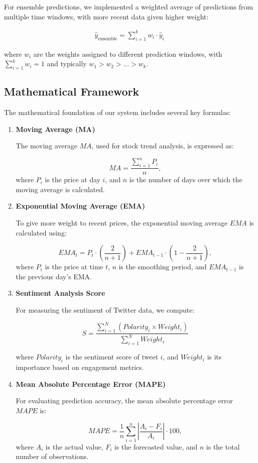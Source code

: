 \documentclass[conference]{IEEEtran}
\begin{document}
For ensemble predictions, we implemented a weighted average of predictions from multiple time windows, with more recent data given higher weight:

\begin{equation}
\begin{aligned}
\hat{y}_{\text{ensemble}} = \sum_{i=1}^{k} w_i \cdot \hat{y}_i
\end{aligned}
\end{equation}

where $w_i$ are the weights assigned to different prediction windows, with $\sum_{i=1}^{k} w_i = 1$ and typically $w_1 > w_2 > ... > w_k$.

\subsection{Mathematical Framework}

The mathematical foundation of our system includes several key formulas:

\begin{enumerate}
\item \textbf{Moving Average (MA)}
    
The moving average \( MA \), used for stock trend analysis, is expressed as:

\[
MA = \frac{\sum_{i=1}^{n} P_i}{n},
\]
where \( P_i \) is the price at day \( i \), and \( n \) is the number of days over which the moving average is calculated.

\item \textbf{Exponential Moving Average (EMA)}
    
To give more weight to recent prices, the exponential moving average \( EMA \) is calculated using:

\[
EMA_t = P_t \cdot \left(\frac{2}{n+1}\right) + EMA_{t-1} \cdot \left(1 - \frac{2}{n+1}\right),
\]
where \( P_t \) is the price at time \( t \), \( n \) is the smoothing period, and \( EMA_{t-1} \) is the previous day's EMA.

\item \textbf{Sentiment Analysis Score}

For measuring the sentiment of Twitter data, we compute:

\[
S = \frac{\sum_{i=1}^{N} (Polarity_i \times Weight_i)}{\sum_{i=1}^{N} Weight_i}
\]

where \(Polarity_i\) is the sentiment score of tweet \(i\), and \(Weight_i\) is its importance based on engagement metrics.

\item \textbf{Mean Absolute Percentage Error (MAPE)}

For evaluating prediction accuracy, the mean absolute percentage error \( MAPE \) is:

\[
MAPE = \frac{1}{n} \sum_{i=1}^{n} \left| \frac{A_i - F_i}{A_i} \right| \cdot 100,
\]
where \( A_i \) is the actual value, \( F_i \) is the forecasted value, and \( n \) is the total number of observations.

\end{enumerate}
\end{document}
